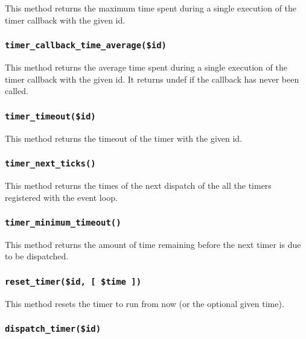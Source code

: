 This method returns the maximum time spent during a single execution
of the timer callback with the given id.

\subsubsection*{\texttt{timer\_callback\_time\_average(\$id)}\label{xPL::Listener_timer_callback_time_average_id_}}


This method returns the average time spent during a single execution
of the timer callback with the given id.  It returns undef if the
callback has never been called.

\subsubsection*{\texttt{timer\_timeout(\$id)}\label{xPL::Listener_timer_timeout_id_}}


This method returns the timeout of the timer with the given id.

\subsubsection*{\texttt{timer\_next\_ticks()}\label{xPL::Listener_timer_next_ticks_}}


This method returns the times of the next dispatch of the all the
timers registered with the event loop.

\subsubsection*{\texttt{timer\_minimum\_timeout()}\label{xPL::Listener_timer_minimum_timeout_}}


This method returns the amount of time remaining before the next timer
is due to be dispatched.

\subsubsection*{\texttt{reset\_timer(\$id, [ \$time ])}\label{xPL::Listener_reset_timer_id_time_}}


This method resets the timer to run from now (or the optional given time).

\subsubsection*{\texttt{dispatch\_timer(\$id)}\label{xPL::Listener_dispatch_timer_id_}}


